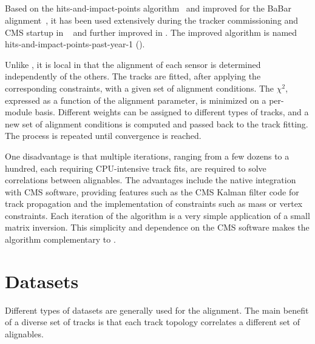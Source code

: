 \subsection[HipPy]{\HIPPY}
Based on the hits-and-impact-points algorithm~\cite{karimaki2003sensor,CMS-NOTE-2006-018}
and improved for the BaBar alignment~\cite{BaBar_alignment},
it has been used extensively during the tracker commissioning
and CMS startup in ~\cite{CMS-NOTE-2009-002}
and further improved in .
The improved algorithm is named hits-and-impact-points-past-year-1 (\HIPPY).

Unlike \MPII, it is local in that the alignment of each sensor is determined independently of the others.
The tracks are fitted, after applying the corresponding constraints,
with a given set of alignment conditions.
The $\chi^2$, expressed as a function of the alignment parameter, is minimized on a per-module basis.
Different weights can be assigned to different types of tracks,
and a new set of alignment conditions is computed and passed back to the track fitting.
The process is repeated until convergence is reached.

One disadvantage is that multiple iterations,
ranging from a few dozens to a hundred,
each requiring CPU-intensive track fits,
are required to solve correlations between alignables.
The advantages include the native integration with CMS software, providing features such as
the CMS Kalman filter code for track propagation
and the implementation of constraints such as mass or vertex constraints.
Each iteration of the algorithm is a very simple application of a small matrix inversion.
This simplicity and dependence on the CMS software makes the \HIPPY algorithm complementary to \MPII.

\section{Datasets}
Different types of datasets are generally used for the alignment.
The main benefit of a diverse set of tracks is that each track topology correlates a different set of alignables.

